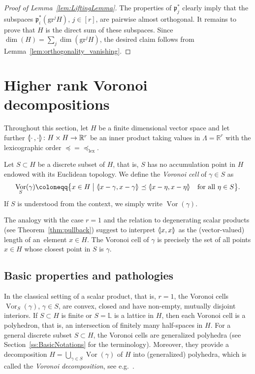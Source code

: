 \documentclass[AHL,Unicode,longabstracts]{cedram}
\newcommand{\llangle}{\mathopen{\langle\mkern -3.1mu\lvert}}
\newcommand{\rrangle}{\mathclose{\rvert\mkern -3.1mu\rangle}}
\newcommand{\highinn}[2]{{\llangle#2\rrangle_{#1}}}
\DeclareMathOperator{\Vor}{Vor}
\newcommand{\R}{\mathbb{R}}
\renewcommand{\L}{\mathbb{L}}
\newcommand{\grm}[2]{\mathrm{gr}_{#1}^{#2}}
\newcommand{\proj}{\mathfrak{p}}
\newcommand{\lexeq}{\preceq_{\mathrm{lex}}}
\renewcommand*{\to}{\mathchoice{\longrightarrow}{\rightarrow}{\rightarrow}{\rightarrow}}
\begin{document}
\begin{proof}[Proof of Lemma~\ref{lem:LiftingLemma}]
The properties of $\proj_j^*$ clearly imply that the subspaces $\proj_i^*(\grm{}{j}H)$, $j \in [r]$, are pairwise almost orthogonal. It remains to prove that $H$ is the direct sum of these subspaces. Since $\dim(H) = \sum_{j} \dim(\grm{}{j}H)$, the desired claim follows from Lemma~\ref{lem:orthogonality_vanishing}.
\end{proof}



\section{Higher rank Voronoi decompositions} \label{sec:HigherRankVoronoiDecompositions}
Throughout this section, let $H$ be a finite dimensional vector space and 
let further $\highinn{}{\cdot\, ,\cdot}\colon H\times H \to \R^r$ be an inner product taking values in $\Lambda = \R^r$ with the lexicographic order $\preceq=\lexeq$.

Let $S \subset H$ be a discrete subset of $H$, that is, $S$ has no accumulation point in $H$ endowed with its Euclidean topology. We define the \emph{Voronoi cell} of $\gamma \in S$ as
\begin{equation}\label{eq:DefinitionVoronoiCell}
\Vor_S(\gamma) \coloneqq \bigl\{x\in H \bigm| \highinn{}{x-\gamma, x- \gamma} \preceq \highinn{}{x-\eta, x-\eta} \quad\text{for all } \eta \in S\bigr\}.
\end{equation}
If $S$ is understood from the context, we simply write $\Vor(\gamma)$.


The analogy with the case $r = 1$ and the relation to degenerating scalar products (see Theorem~\ref{thm:pullback}) suggest to interpret $\highinn{}{x, x}$ as the (vector-valued) length of an~element $x \in H$. The Voronoi cell of $\gamma$ is precisely the set of all points $x \in H$ whose closest point in $S$ is $\gamma$.


\subsection{Basic properties and pathologies} \label{ss:Pathologies}
In the classical setting of a scalar product, that is, $r=1$, the Voronoi cells $\Vor_S(\gamma)$, $\gamma \in S$, are convex, closed and have non-empty, mutually disjoint interiors. If $S \subset H$ is finite or $S= \L$ is a lattice in $H$, then each Voronoi cell is a polyhedron, that is, an intersection of finitely many half-spaces in $H$. For a general discrete subset $S \subset H$, the Voronoi cells are generalized polyhedra (see Section~\ref{ss:BasicNotations} for the terminology). Moreover, they provide a decomposition $H = \bigcup_{\gamma \in S} \Vor(\gamma)$ of $H$ into (generalized) polyhedra, which is called the \emph{Voronoi decomposition}, see e.g.~\cite[p.~465]{Gruber}.
\end{document}
